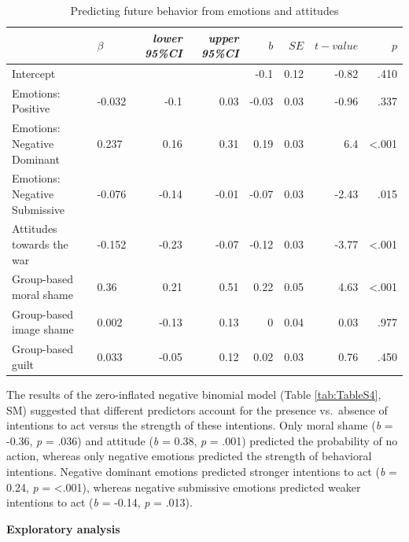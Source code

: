 \documentclass[
]{article}
\begin{document}
\begin{table}[H]
\centering
\caption{\label{tab:Table3}Predicting future behavior from emotions and attitudes
}
\centering
\fontsize{8}{10}\selectfont
\begin{tabular}[t]{llrrrrrr}
\toprule
\em{ } & \em{$\beta$} & \em{lower 95\%CI} & \em{upper 95\%CI} & \em{$b$} & \em{$SE$} & \em{$t-value$} & \em{$p$}\\
\midrule
Intercept &  &  &  & -0.1 & 0.12 & -0.82 & .410\\
Emotions: Positive & -0.032 & -0.1 & 0.03 & -0.03 & 0.03 & -0.96 & .337\\
Emotions: Negative Dominant & 0.237 & 0.16 & 0.31 & 0.19 & 0.03 & 6.4 & <.001\\
Emotions: Negative Submissive & -0.076 & -0.14 & -0.01 & -0.07 & 0.03 & -2.43 & .015\\
Attitudes towards the war & -0.152 & -0.23 & -0.07 & -0.12 & 0.03 & -3.77 & <.001\\
Group-based moral shame & 0.36 & 0.21 & 0.51 & 0.22 & 0.05 & 4.63 & <.001\\
Group-based image shame & 0.002 & -0.13 & 0.13 & 0 & 0.04 & 0.03 & .977\\
Group-based guilt & 0.033 & -0.05 & 0.12 & 0.02 & 0.03 & 0.76 & .450\\
\bottomrule
\end{tabular}
\end{table}

The results of the zero-inflated negative binomial model (Table \ref{tab:TableS4}, SM) suggested that different predictors account for the presence vs.~absence of intentions to act versus the strength of these intentions. Only moral shame (\emph{b} = -0.36, \emph{p} = .036) and attitude (\emph{b} = 0.38, \emph{p} = .001) predicted the probability of no action, whereas only negative emotions predicted the strength of behavioral intentions. Negative dominant emotions predicted stronger intentions to act (\emph{b} = 0.24, \emph{p} = \textless.001), whereas negative submissive emotions predicted weaker intentions to act (\emph{b} = -0.14, \emph{p} = .013).

\textbf{Exploratory analysis}
\end{document}
